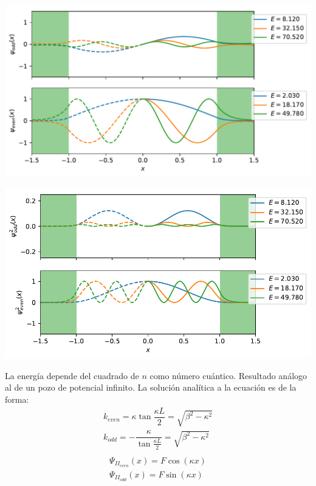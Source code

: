 \documentclass[paper=letter, fontsize=11pt]{scrartcl}
\begin{document}
\newpage

\begin{center}
	\includegraphics[width=\linewidth]{finite-box.pdf}
\end{center}
\begin{center}
	\includegraphics[width=\linewidth]{psi-squared.pdf}
\end{center}

La energ\'ia depende del cuadrado de $n$ como n\'umero cu\'antico. Resultado an\'alogo al de un pozo de potencial infinito. La soluci\'on anal\'itica a la ecuaci\'on es de la forma:
\begin{equation}
\begin{array}{c}
k_{even} = \kappa\tan\dfrac{\kappa L}{2} = \sqrt{\beta^2 - \kappa^2} \\
k_{odd} = -\dfrac{\kappa}{\tan\frac{\kappa L}{2}} = \sqrt{\beta^2 - \kappa^2}\\
\end{array}
\end{equation}
\begin{equation}
\begin{array}{c}
\Psi_{II_{even}}(x) = F\cos(\kappa x)\\
\Psi_{II_{odd}}(x) = F\sin(\kappa x)
\end{array}
\end{equation}
\end{document}
